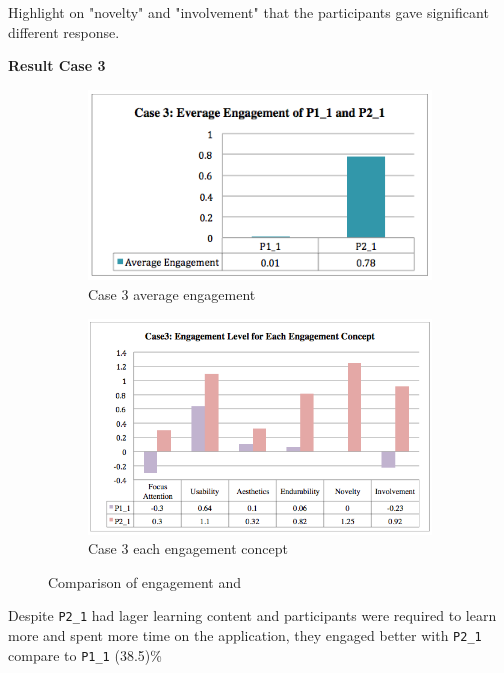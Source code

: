 Highlight on "novelty" and "involvement" that the participants gave significant different response.


\textbf{Result Case 3} 
\begin{figure}[!hbt]\centering
    \begin{subfigure}{0.7\textwidth}
 \includegraphics[width=\textwidth]{case3a}
 \caption{Case 3 average engagement}
    \end{subfigure}\hspace{0.1\textwidth}
    \begin{subfigure}{1.0\textwidth}
\includegraphics[width=\textwidth]{case3b}
  \caption{Case 3 each engagement concept}
    \end{subfigure}
    \caption{Comparison of engagement   and }
\end{figure}

Despite \verb|P2_1| had lager learning content and participants were required to learn more and spent more time on the application, they engaged better with \verb|P2_1| compare to \verb|P1_1| (38.5)\% 

